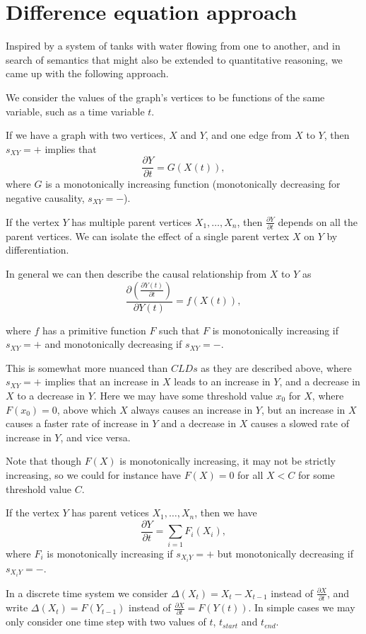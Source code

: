 \documentclass[a4paper,11pt]{article}
\begin{document}
\section{Difference equation approach}

Inspired by a system of tanks with water flowing from one to another,
and in search of semantics that might also be extended to quantitative
reasoning, we came up with the following approach.

We consider the values of the graph's vertices to be functions of the same
variable, such as a time variable $t$.

If we have a graph with two vertices, $X$ and $Y$, and one edge from $X$
to $Y$, then $s_{XY}=+$ implies that
\[\frac{\partial Y}{\partial t} = G(X(t)),\]
where $G$ is a monotonically increasing function (monotonically decreasing for negative
causality, $s_{XY}=-$).

If the vertex $Y$ has multiple parent vertices $X_1,\ldots,X_n$, then
$\frac{\partial Y}{\partial t}$ depends on all the parent vertices. We can
isolate the effect of a single parent vertex
 $X$ on $Y$ by differentiation.

In general we can then describe the causal relationship from $X$ to
$Y$ as
\[\frac{\partial\left( \frac{\partial Y(t)}{\partial t} \right)}{\partial Y(t)} =
  f(X(t)),\]

where $f$ has a primitive function $F$ such that $F$ is monotonically
increasing if $s_{XY}=+$ and monotonically decreasing if $s_{XY}= -$.

This is somewhat more nuanced than $CLDs$ as they are described above,
where $s_{XY}=+$ implies that an increase in $X$ leads to an increase
in $Y$, and a decrease in $X$ to a decrease in $Y$.
%
Here we may have some threshold value $x_0$ for $X$, where $F(x_0) = 0$,
above which $X$ always causes an increase in $Y$, but an increase in $X$
causes a faster rate of increase in $Y$ and a decrease in $X$ causes a
slowed rate of increase in $Y$, and vice versa.

Note that though $F(X)$ is monotonically increasing, it may not be strictly
increasing, so we could for instance have $F(X) = 0$ for all $X < C$
for some threshold value $C$.

If the vertex $Y$ has parent vetices $X_1,\ldots,X_n$, then we have
\[\frac{\partial Y}{\partial t} = \sum_{i=1}F_i(X_i),\]
where $F_i$ is monotonically increasing if $s_{X_iY}=+$ but monotonically
decreasing if $s_{X_iY}=-$.

In a discrete time system we consider $\Delta(X_t) = X_t - X_{t-1}$
instead of $\frac{\partial X}{\partial t}$, and write
$\Delta(X_t) = F(Y_{t-1})$ instead of
$\frac{\partial X}{\partial t} = F(Y(t))$.
%
In simple cases we may only consider one time step with two values of
$t$, $t_{start}$ and $t_{end}$.
\end{document}
